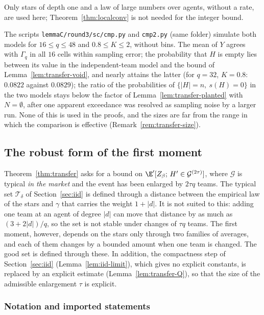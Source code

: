 Only stars of depth one and a law of large numbers over agents, without a rate, are used here;
Theorem~\ref{thm:localconv} is not needed for the integer bound.

\begin{remark}\label{rem:transfer-numerics}
The scripts \texttt{lemmaC/\allowbreak round3/\allowbreak sc/\allowbreak cmp.py} and \texttt{cmp2.py} (same folder) simulate both models for
$16\le q\le48$ and $0.8\le K\le2$, without bins. The mean of $Y$ agrees with $\Gamma_q$ in all
$16$ cells within sampling error; the probability that $H$ is empty lies between its value in
the independent-team model and the bound of Lemma~\ref{lem:transfer-void}, and nearly attains
the latter (for $q=32$, $K=0.8$: $0.0822$ against $0.0829$); the ratio of the probabilities of
$\{|H|=n,\ s(H)=0\}$ in the two models stays below the factor of
Lemma~\ref{lem:transfer-planted} with $N=\emptyset$, after one apparent exceedance was
resolved as sampling noise by a larger run. None of this is used in the proofs, and the sizes
are far from the range in which the comparison is effective
(Remark~\ref{rem:transfer-size}).
\end{remark}

\subsection{The robust form of the first moment}\label{sec:transfer-robust}

Theorem~\ref{thm:transfer} asks for a bound on $\E'[Z_\beta;\,H'\in\mathcal G^{(2\tau)}]$, where
$\mathcal G$ is typical \emph{in the market} and the event has been enlarged by $2\tau q$
teams. The typical set $\mathcal T_\delta$ of Section~\ref{sec:iid} is defined through a
distance between the empirical law of the stars and $\gamma$ that carries the weight $1+|d|$.
It is not suited to this: adding one team at an agent of degree $|d|$ can move that distance
by as much as $(3+2|d|)/q$, so the set is not stable under changes of $\tau q$ teams. The
first moment, however, depends on the stars only through two families of averages, and each of
them changes by a bounded amount when one team is changed. The good set is defined through
these. In addition, the compactness step of Section~\ref{sec:iid}
(Lemma~\ref{lem:iid-limit}), which gives no explicit constants, is replaced by an explicit estimate (Lemma~\ref{lem:transfer-Q}), so that the size
of the admissible enlargement $\tau$ is explicit.

\subsubsection*{Notation and imported statements}


